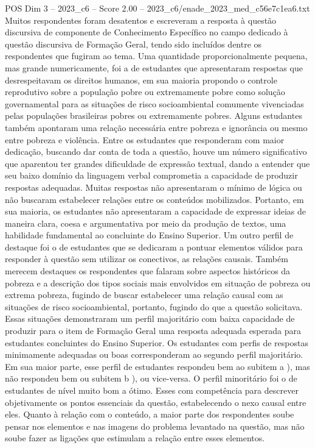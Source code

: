 \begin{textsample}{POS Dim 3 – 2023\_c6 – Score 2.00 – 2023\_c6/enade\_2023\_med\_c56e7c1ea6.txt}
Muitos respondentes foram desatentos e escreveram a resposta à questão discursiva de componente de Conhecimento Específico no campo dedicado à questão discursiva de Formação Geral, tendo sido incluídos dentre os respondentes que fugiram ao tema.
Uma quantidade proporcionalmente pequena, mas grande numericamente, foi a de estudantes que apresentaram respostas que desrespeitavam os direitos humanos, em sua maioria propondo o controle reprodutivo sobre a população pobre ou extremamente pobre como solução governamental para as situações de risco socioambiental comumente vivenciadas pelas populações brasileiras pobres ou extremamente pobres.
Alguns estudantes também apontaram uma relação necessária entre pobreza e ignorância ou mesmo entre pobreza e violência.
Entre os estudantes que responderam com maior dedicação, buscando dar conta de toda a questão, houve um número significativo que aparentou ter grandes dificuldade de expressão textual, dando a entender que seu baixo domínio da linguagem verbal comprometia a capacidade de produzir respostas adequadas.
Muitas respostas não apresentaram o mínimo de lógica ou não buscaram estabelecer relações entre os conteúdos mobilizados.
Portanto, em sua maioria, os estudantes não apresentaram a capacidade de expressar ideias de maneira clara, coesa e argumentativa por meio da produção de textos, uma habilidade fundamental ao concluinte do Ensino Superior.
Um outro perfil de destaque foi o de estudantes que se dedicaram a pontuar elementos válidos para responder à questão sem utilizar os conectivos, as relações causais.
Também merecem destaques os respondentes que falaram sobre aspectos históricos da pobreza e a descrição dos tipos sociais mais envolvidos em situação de pobreza ou extrema pobreza, fugindo de buscar estabelecer uma relação causal com as situações de risco socioambiental, portanto, fugindo do que a questão solicitava.
Essas situações demonstraram um perfil majoritário com baixa capacidade de produzir para o item de Formação Geral uma resposta adequada esperada para estudantes concluintes do Ensino Superior.
Os estudantes com perfis de respostas minimamente adequadas ou boas corresponderam ao segundo perfil majoritário.
Em sua maior parte, esse perfil de estudantes respondeu bem ao subitem a ), mas não respondeu bem ou subitem b ), ou vice-versa.
O perfil minoritário foi o de estudantes de nível muito bom a ótimo.
Esses com competência para descrever objetivamente os pontos essenciais da questão, estabelecendo o nexo causal entre eles.
Quanto à relação com o conteúdo, a maior parte dos respondentes soube pensar nos elementos e nas imagens do problema levantado na questão, mas não soube fazer as ligações que estimulam a relação entre esses elementos.

\end{textsample}
